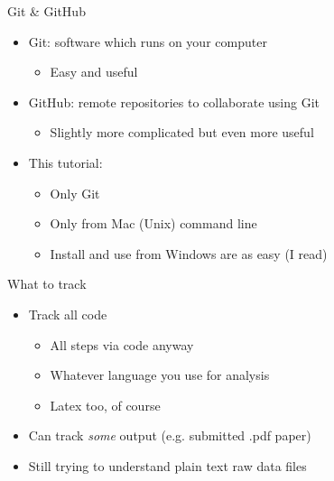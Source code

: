 \documentclass[12pt]{beamer}
\begin{document}
\begin{frame}{Git \& GitHub}
\begin{itemize}
	\item Git: software which runs on your computer
\begin{itemize}
	\item Easy and useful
\end{itemize}	
	\vspace{.3cm}
	\item GitHub: remote repositories to collaborate using Git
\begin{itemize}
	\item Slightly more complicated but even more useful
\end{itemize}
	\vspace{.5cm}
	
	\item This tutorial:
\begin{itemize}
	\item Only Git
	\item Only from Mac (Unix) command line
	\item Install and use from Windows are as easy (I read)
\end{itemize}	
\end{itemize}

\end{frame}



\begin{frame}{What to track}
\begin{itemize}
\item Track all code
\begin{itemize}
	\item All steps via code anyway
	\item Whatever language you use for analysis
	\item Latex too, of course
\end{itemize}	
	\vspace{.5cm}
\item Can track \textit{some} output (e.g. submitted .pdf paper)
	\vspace{.5cm}
\item Still trying to understand plain text raw data files
\end{itemize}

\end{frame}
\end{document}
